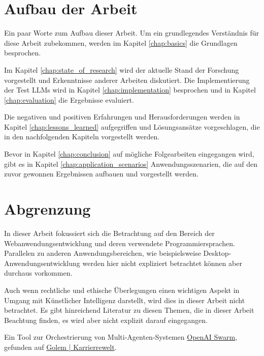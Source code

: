 \section{Aufbau der Arbeit}
Ein paar Worte zum Aufbau dieser Arbeit. Um ein grundlegendes Verständnis für diese Arbeit zubekommen, werden im Kapitel \ref{chap:basics} die Grundlagen besprochen.\vspace{0.2cm}

Im Kapitel \ref{chap:state_of_research} wird der aktuelle Stand der Forschung vorgestellt und Erkenntnisse anderer Arbeiten diskutiert. Die Implementierung der Test LLMs wird in Kapitel \ref{chap:implementation} besprochen und in Kapitel \ref{chap:evaluation} die Ergebnisse evaluiert.\vspace{0.2cm}

Die negativen und positiven Erfahrungen und Herausforderungen werden in Kapitel \ref{chap:lessons_learned} aufgegriffen und Lösungsansätze vorgeschlagen, die in den nachfolgenden Kapiteln vorgestellt werden.\vspace{0.2cm}

Bevor in Kapitel \ref{chap:conclusion} auf mögliche Folgearbeiten eingegangen wird, gibt es in Kapitel \ref{chap:application_scenarios} Anwendungsszenarien, die auf den zuvor gewonnen Ergebnissen aufbauen und vorgestellt werden.


\section{Abgrenzung}
In dieser Arbeit fokussiert sich die Betrachtung auf den Bereich der Webanwendungsentwicklung und deren verwendete Programmiersprachen. Parallelen zu anderen Anwendungsbereichen, wie beispielsweise Desktop-Anwendungsentwicklung werden hier nicht expliziert betrachtet können aber durchaus vorkommen.\vspace{0.2cm}

Auch wenn rechtliche und ethische Überlegungen einen wichtigen Aspekt in Umgang mit Künstlicher Intelligenz darstellt, wird dies in dieser Arbeit nicht betrachtet. Es gibt hinreichend Literatur zu diesen Themen, die in dieser Arbeit Beachtung finden, es wird aber nicht explizit darauf eingegangen.\vspace{0.2cm}

\begin{tcolorbox}[
	enhanced,
	breakable,
	colback=red!5!white,
	colframe=red!75!black!50,
	title= Mein roter Faden: noch was zum Testen
	]
	Ein Tool zur Orchestrierung von Multi-Agenten-Systemen \href{https://community.openai.com/t/introducing-swarm-js-node-js-implementation-of-openai-swarm/977510}{OpenAI Swarm}, gefunden auf \href{https://karrierewelt.golem.de/blogs/karriere-ratgeber/bot-belegschaft-mit-entlastungspotenzial-ki-agenten-fur-den-arbeitsalltag-in-der-testphase-1}{Golem | Karrierrewelt}.
\end{tcolorbox}
